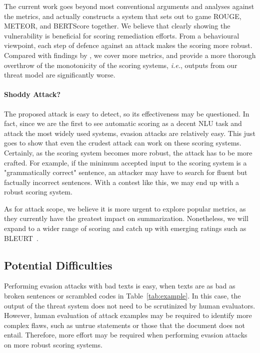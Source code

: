 \documentclass[11pt]{article}
\theoremstyle{remark}
\begin{document}
The current work goes beyond most conventional arguments and analyses against the metrics, and actually constructs a system that sets out to game ROUGE, METEOR, and BERTScore together. We believe that clearly showing the vulnerability is beneficial for scoring remediation efforts. From a behavioural viewpoint, each step of defence against an attack makes the scoring more robust. Compared with findings by \citeauthor{paulus2018a}, we cover more metrics, and provide a more thorough overthrow of the monotonicity of the scoring systems, \emph{i.e.}, outputs from our threat model are significantly worse.

\paragraph{Shoddy Attack?}
The proposed attack is easy to detect, so its effectiveness may be questioned. In fact, since we are the first to see automatic scoring as a decent NLU task and attack the most widely used systems, evasion attacks are relatively easy. This just goes to show that even the crudest attack can work on these scoring systems. Certainly, as the scoring system becomes more robust, the attack has to be more crafted. For example, if the minimum accepted input to the scoring system is a "grammatically correct" sentence, an attacker may have to search for fluent but factually incorrect sentences. With a contest like this, we may end up with a robust scoring system.

As for attack scope, we believe it is more urgent to explore popular metrics, as they currently have the greatest impact on summarization. Nonetheless, we will expand to a wider range of scoring and catch up with emerging ratings such as BLEURT~\cite{sellam-etal-2020-bleurt}.

\subsection{Potential Difficulties}
Performing evasion attacks with bad texts is easy, when texts are as bad as broken sentences or scrambled codes in Table~\ref{tab:example}. In this case, the output of the threat system does not need to be scrutinized by human evaluators. However, human evaluation of attack examples may be required to identify more complex flaws, such as untrue statements or those that the document does not entail. Therefore, more effort may be required when performing evasion attacks on more robust scoring systems.
\end{document}
